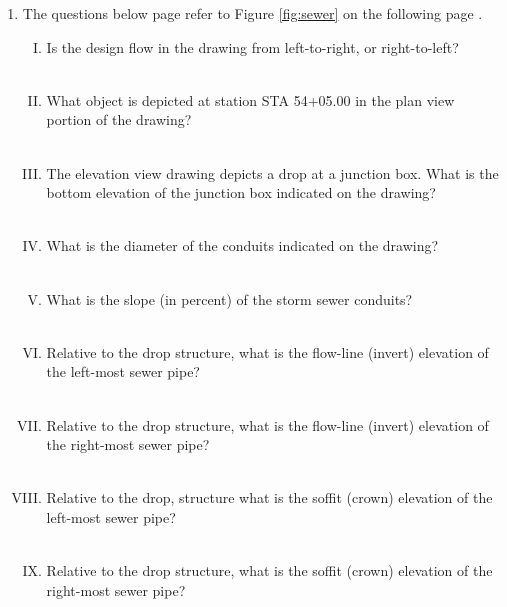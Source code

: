 \documentclass[11pt]{article}
\begin{document}
\begin{enumerate}
\clearpage
\item The questions below page refer to Figure \ref{fig:sewer} on the following page . 
\begin{enumerate}[(I)]
\item Is the design flow in the drawing from left-to-right, or right-to-left?
~\\
~\\
\item What object is depicted at station STA 54+05.00 in the plan view portion of the drawing?
~\\
~\\
\item The elevation view drawing depicts a drop at a junction box.  What is the bottom elevation of the junction box indicated on the drawing?
~\\
~\\
\item What is the diameter of the conduits indicated on the drawing?
~\\
~\\
\item What is the slope (in percent) of the storm sewer conduits?
~\\
~\\
\item Relative to the drop structure, what is the flow-line (invert) elevation of the left-most sewer pipe?
~\\
~\\
\item Relative to the drop structure, what is the flow-line (invert) elevation of the right-most sewer pipe?
~\\
~\\
\item Relative to the drop, structure what is the soffit (crown) elevation of the left-most sewer pipe?
~\\
~\\
\item Relative to the drop structure, what is the soffit (crown) elevation of the right-most sewer pipe?
~\\
~\\
\end{enumerate}
\begin{figure}[ht!] %
\centering

\end{figure}
\end{enumerate}
\end{document}
